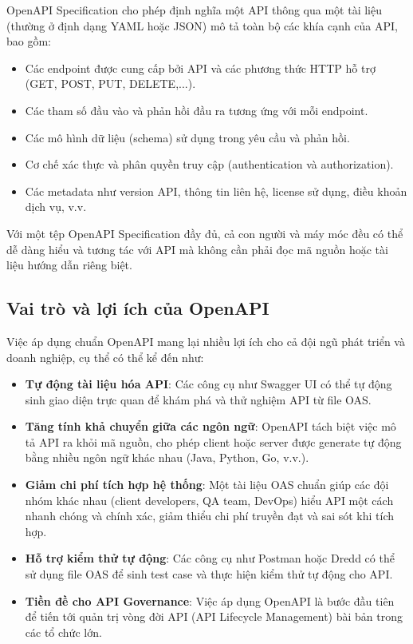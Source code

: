 \documentclass{uetgraduation}
\begin{document}
OpenAPI Specification cho phép định nghĩa một API thông qua một tài liệu (thường ở định dạng YAML hoặc JSON) mô tả toàn bộ các khía cạnh của API, bao gồm:

\begin{itemize}
    \item Các endpoint được cung cấp bởi API và các phương thức HTTP hỗ trợ 
 (GET, POST, PUT, DELETE,...).
    \item Các tham số đầu vào và phản hồi đầu ra tương ứng với mỗi endpoint.
    \item Các mô hình dữ liệu (schema) sử dụng trong yêu cầu và phản hồi.
    \item Cơ chế xác thực và phân quyền truy cập (authentication và authorization).
    \item Các metadata như version API, thông tin liên hệ, license sử dụng, điều khoản dịch vụ, v.v.
\end{itemize}

Với một tệp OpenAPI Specification đầy đủ, cả con người và máy móc đều có thể dễ dàng hiểu và tương tác với API mà không cần phải đọc mã nguồn hoặc tài liệu hướng dẫn riêng biệt.

\subsection{Vai trò và lợi ích của OpenAPI}

Việc áp dụng chuẩn OpenAPI mang lại nhiều lợi ích cho cả đội ngũ phát triển và doanh nghiệp, cụ thể có thể kể đến như:

\begin{itemize}
    \item \textbf{Tự động tài liệu hóa API}: Các công cụ như Swagger UI có thể tự động sinh giao diện trực quan để khám phá và thử nghiệm API từ file OAS.
    \item \textbf{Tăng tính khả chuyển giữa các ngôn ngữ}: OpenAPI tách biệt việc mô tả API ra khỏi mã nguồn, cho phép client hoặc server được generate tự động bằng nhiều ngôn ngữ khác nhau (Java, Python, Go, v.v.).
    \item \textbf{Giảm chi phí tích hợp hệ thống}: Một tài liệu OAS chuẩn giúp các đội nhóm khác nhau (client developers, QA team, DevOps) hiểu API một cách nhanh chóng và chính xác, giảm thiểu chi phí truyền đạt và sai sót khi tích hợp.
    \item \textbf{Hỗ trợ kiểm thử tự động}: Các công cụ như Postman hoặc Dredd có thể sử dụng file OAS để sinh test case và thực hiện kiểm thử tự động cho API.
    \item \textbf{Tiền đề cho API Governance}: Việc áp dụng OpenAPI là bước đầu tiên để tiến tới quản trị vòng đời API (API Lifecycle Management) bài bản trong các tổ chức lớn.
\end{itemize}
\end{document}
